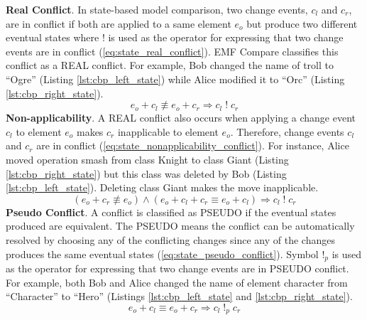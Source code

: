 \textbf{Real Conflict}. In state-based model comparison, two change events, $c_{l}$ and $c_{r}$, are in conflict if both are applied to a same element $e_{o}$ but produce two different eventual states where $!$ is used as the operator for expressing that two change events are in conflict (\ref{eq:state_real_conflict}). EMF Compare \cite{emfcompare2018developer} classifies this conflict as a \textsf{REAL} conflict. For example, Bob changed the \textsf{name} of \textsf{troll} to ``Ogre'' (Listing \ref{lst:cbp_left_state}) while Alice modified it to ``Orc'' (Listing \ref{lst:cbp_right_state}). 
\begin{equation} \label{eq:state_real_conflict}
e_{o} + c_{l} \not\equiv e_{o} + c_{r} \Rightarrow c_{l}\;!\;c_{r}
\end{equation} 
\textbf{Non-applicability}. A \textsf{REAL} conflict also occurs when applying a change event $c_{l}$ to element $e_{o}$ makes $c_{r}$ inapplicable to element $e_{o}$. Therefore, change events $c_{l}$ and $c_{r}$ are in conflict (\ref{eq:state_nonapplicability_conflict}). 
For instance, Alice moved operation \textsf{smash} from class \textsf{Knight} to class \textsf{Giant} (Listing \ref{lst:cbp_right_state}) but this class was deleted by Bob (Listing \ref{lst:cbp_left_state}). Deleting class \textsf{Giant} makes the move inapplicable. 
\begin{equation} \label{eq:state_nonapplicability_conflict}
(e_{o} + c_{r} \not\equiv e_{o}) \wedge (e_{o} + c_{l} + c_{r} \equiv e_{o} + c_{l}) \Rightarrow c_{l}\;!\;c_{r}
\end{equation}
\textbf{Pseudo Conflict}. A conflict is classified as \textsf{PSEUDO} if the eventual states produced are equivalent. The \textsf{PSEUDO} means the conflict can be automatically resolved by choosing any of the conflicting changes since any of the changes produces the same eventual states (\ref{eq:state_pseudo_conflict}). Symbol $!_{p}$ is used as the operator for expressing that two change events are in \textsf{PSEUDO} conflict. For example, both Bob and Alice changed the \textsf{name} of element \textsf{character} from ``Character'' to ``Hero'' (Listings \ref{lst:cbp_left_state} and \ref{lst:cbp_right_state}). 
\begin{equation} \label{eq:state_pseudo_conflict}
e_{o} + c_{l} \equiv e_{o} + c_{r} \Rightarrow c_{l}\;!_{p}\;c_{r}
\end{equation} 
